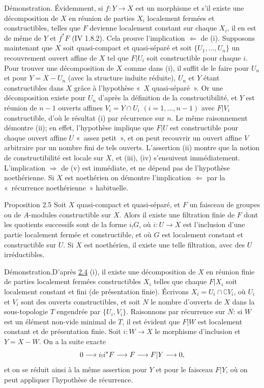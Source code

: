 \documentclass[10pt]{../fichiers-configuration-latex/smfart}
\begin{document}
Démonstration. Évidemment, si $f:Y\rightarrow X$ est un morphisme et
s'il existe une décomposition de $X$ en réunion de parties $X_i$
localement fermées et constructibles, telles que $F$ devienne
localement constant sur chaque $X_i$, il en est de même de $Y$ et
$f^{\ast}F$ (\cf \EGA IV 1.8.2). Cela prouve l'implication $\Leftarrow$
de (i). Supposons maintenant que $X$ soit quasi-compact et
quasi-séparé et soit $\{U_1,\ldots,U_n\}$ un recouvrement ouvert
affine de $X$ tel que $F|U_i$ soit constructible pour chaque
$i$. Pour trouver une décomposition de $X$ comme dans (i), il suffit
de le faire pour $U_n$ et pour $Y=X-U_n$ (avec la structure induite
réduite), $U_n$ et $Y$ étant constructibles dans $X$ grâce à
l'hypothèse « $X$ quasi-séparé ». Or une décomposition existe pour
$U_n$ d'après la définition de la constructibilité, et $Y$ est réunion de
$n-1$ ouverts affines $V_i=Y\cap U_i$ $(i=1,\ldots,n-1)$ avec $F|
V_i$ constructible, d'où le résultat (i) par récurrence sur $n$. Le
même raisonnement démontre (ii); en effet, l'hypothèse implique que
$F| U$ est constructible pour chaque ouvert affine $U$ « assez
petit », et on peut recouvrir un ouvert affine $V$ arbitraire par un
nombre fini de tels ouverts. L'assertion (ii) montre que la notion de
constructibilité est locale sur $X$, et (iii), (iv) s'ensuivent
immédiatement. L'implication $\Rightarrow$ de (v) est immédiate, et ne
dépend pas de l'hypothèse noethérienne. Si $X$ est noethérien on
démontre l'implication $\Leftarrow$ par la « récurrence
noethérienne » habituelle.

\begin{enonce*}{Proposition 2.5}
Soit $X$ quasi-compact et quasi-séparé, et $F$ un faisceau de groupes
ou de $A$-modules constructible sur $X$. Alors il existe une
filtration finie de $F$ dont les quotients successifs sont de la forme
$i_{!}G$, où $i:U\rightarrow X$ est l'inclusion d'une partie
localement fermée et constructible, et où $G$ est localement constant
et constructible sur $U$. Si $X$ est noethérien, il existe une telle
filtration, avec des $U$ irréductibles.
\end{enonce*}

Démonstration.\pageoriginale D'après \hyperref[IX.prop2.4]{2.4} (i), il existe une
décomposition de $X$ en réunion finie de parties localement fermées
constructibles $X_i$ telles que chaque $F|X_i$ soit localement
constant et fini (\resp de présentation finie). Écrivons $X_i=U_i\cap
\complement V_i$, où $U_i$ et $V_i$ sont des ouverts constructibles,
et soit $N$ le nombre d'ouverts de $X$ dans la sous-topologie $T$
engendrée par $\{U_i,V_i\}$. Raisonnons par récurrence sur $N$: si $W$
est un élément non-vide minimal de $T$, il est évident que $F|W$
est localement constant et de présentation finie. Soit $i:W\rightarrow
X$ le morphisme d'inclusion et $Y=X-W$. On a la suite exacte
$$
0\longrightarrow i_{!}i^{\ast}F\longrightarrow F\longrightarrow F|
Y\longrightarrow 0{},
$$
et on se réduit ainsi à la même assertion pour $Y$ et pour le faisceau
$F| Y$, où on peut appliquer l'hypothèse de récurrence.
\end{document}
